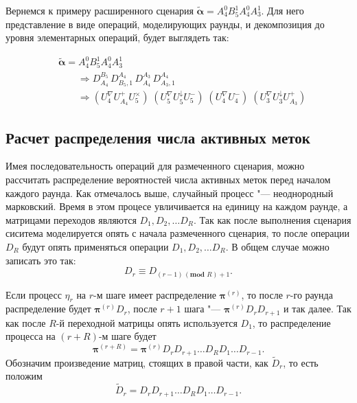 Вернемся к примеру расширенного сценария $\widetilde{\bm{\alpha}} = A^0_4 B^1_5 A^0_4 A^1_3$. Для него представление в виде операций, моделирующих раунды, и декомпозиция до уровня элементарных операций, будет выглядеть так:

$$
\begin{aligned}
  &\widetilde{\bm{\alpha}} = A^0_4 B^1_5 A^0_4 A^1_3 \\
  &\qquad \Longrightarrow D_{A_4}^{B_5}\, D_{B_5,1}^{A_4}\, D_{A_4}^{A_3}\, D_{A_3,1}^{A_4}\\
  &\qquad \Longrightarrow (U_4^\nabla U_{A_4}^+ U_5^\times) \; (U_5^\nabla U_5^\downarrow U_5^-) \; (U_4^\nabla U_4^-) \; (U_3^\nabla U_3^\downarrow U_{A_3}^+)
\end{aligned}
$$




\subsection{Расчет распределения числа активных меток}
Имея последовательность операций для размеченного сценария, можно рассчитать распределение вероятностей числа активных меток перед началом каждого раунда. Как отмечалось выше, случайный процесс "--- неоднородный марковский. Время в этом процесе увличивается на единицу на каждом раунде, а матрицами переходов являются $D_1, D_2, \dots D_R$. Так как после выполнения сценария сиситема моделируется опять с начала  размеченного сценария, то после операции $D_R$ будут опять применяться операции $D_1, D_2, \dots D_R$. В общем случае можно записать это так:
$$
	D_r \equiv D_{(r - 1)\, (\textbf{mod } R) + 1}.
$$

Если процесс $\eta_r$ на $r$-м шаге имеет распределение $\bm{\pi}^{(r)}$, то после $r$-го раунда распределение будет $\bm{\pi}^{(r)} D_r$, после $r+1$ шага "--- $\bm{\pi}^{(r)} D_r D_{r+1}$ и так далее. Так как после $R$-й переходной матрицы опять используется $D_1$, то распределение процесса на $(r+R)$-м шаге будет
$$
	\bm{\pi}^{(r+R)} = \bm{\pi}^{(r)} D_r D_{r+1} \dots D_R D_1 \dots D_{r-1}.
$$
Обозначим произведение матриц, стоящих в правой части, как $\widetilde{D}_{r}$, то есть положим
$$
	\widetilde{D}_r = D_r D_{r+1} \dots D_R D_1 \dots D_{r-1}.
$$

